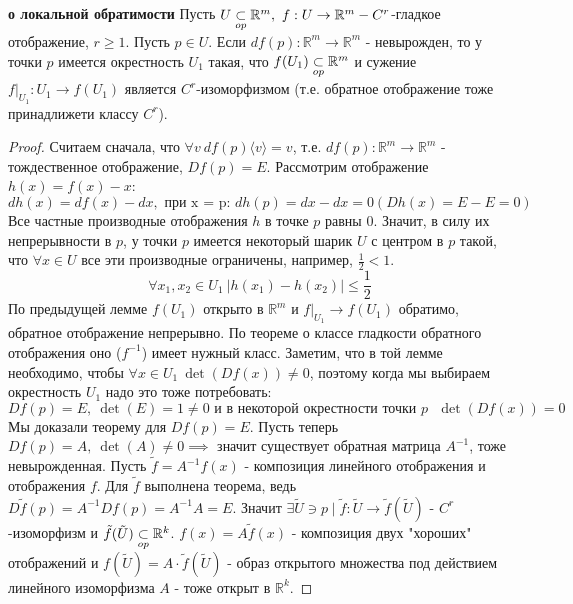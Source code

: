 \newpage
\begin{theorem}
    \textbf{о локальной обратимости}
    \newline
    Пусть $U \underset{op}{\subset} \mathbb{R}^m, \ f:U \to \mathbb{R}^m - C^r$-гладкое отображение, $r \geq 1$.
    Пусть $p \in U$. Если $df(p): \mathbb{R}^m \to \mathbb{R}^m$ - невырожден, то у точки $p$ имеется окрестность $U_1$ такая, что 
    $f(U_1) \underset{op}{\subset} \mathbb{R}^m$ и сужение $f|_{U_1}: U_1 \to f(U_1)$ является $C^r$-изоморфизмом (т.е. обратное отображение тоже принадлижети классу $C^r$).
    \begin{proof}
        Считаем сначала, что $\forall v \ df(p)\langle v \rangle = v$, т.е. $df(p):\mathbb{R}^m \to \mathbb{R}^m$ - тождественное отображение, $Df(p) = E$.
        Рассмотрим отображение $h(x) = f(x) - x$:
        \[dh(x) = df(x) - dx, \text{ при x = p: } dh(p) = dx - dx = 0 (Dh(x) = E - E = 0)\]
        Все частные производные отображения $h$ в точке $p$ равны 0. Значит, в силу их непрерывности в $p$,
        у точки $p$ имеется некоторый шарик $U$ с центром в $p$ такой, что $\forall x \in U$ все эти производные ограничены, например, $\frac{1}{2} < 1$.
        \[\forall x_1, x_2 \in U_1 \ \left|h(x_1) - h(x_2) \right| \leq \frac{1}{2} \]
        По предыдущей лемме $f(U_1)$ открыто в $\mathbb{R}^m$ и $f|_{U_1} \to f(U_1)$ обратимо, обратное отображение непрерывно.
        По теореме о классе гладкости обратного отображения оно ($f^{-1}$) имеет нужный класс. Заметим, что в той лемме необходимо, чтобы $\forall x \in U_1 \ \det(Df(x)) \neq 0$, 
        поэтому когда мы выбираем окрестность $U_1$ надо это тоже потребовать:
        \[Df(p) = E, \ \det(E) = 1 \neq 0 \text{ и в некоторой окрестности  точки $p$ } \det(Df(x)) = 0\]
        \newline
        Мы доказали теорему для $Df(p) = E$. Пусть теперь $Df(p) = A, \ \det(A) \neq 0 \implies$ значит существует обратная матрица $A^{-1}$, тоже невырожденная. Пусть $\tilde{f} = A^{-1}f(x)$ - композиция линейного отображения и отображения $f$.
        Для $\tilde{f}$ выполнена теорема, ведь $D\tilde{f}(p) = A^{-1}Df(p) = A^{-1}A = E$.
        Значит $\exists \tilde{U} \ni p \mid \tilde{f}:\tilde{U} \to \tilde{f}(\tilde{U})$ - $C^r$-изоморфизм и $\tilde{f}(\tilde{U}) \underset{op}{\subset} \mathbb{R}^k$.
        \newline
        $f(x) = A \tilde{f}(x)$ - композиция двух "хороших" отображений и $f(\tilde{U}) = A\cdot\tilde{f}(\tilde{U})$ - образ открытого множества под действием линейного изоморфизма $A$ - тоже открыт в $\mathbb{R}^k$.
    \end{proof}
\end{theorem}


